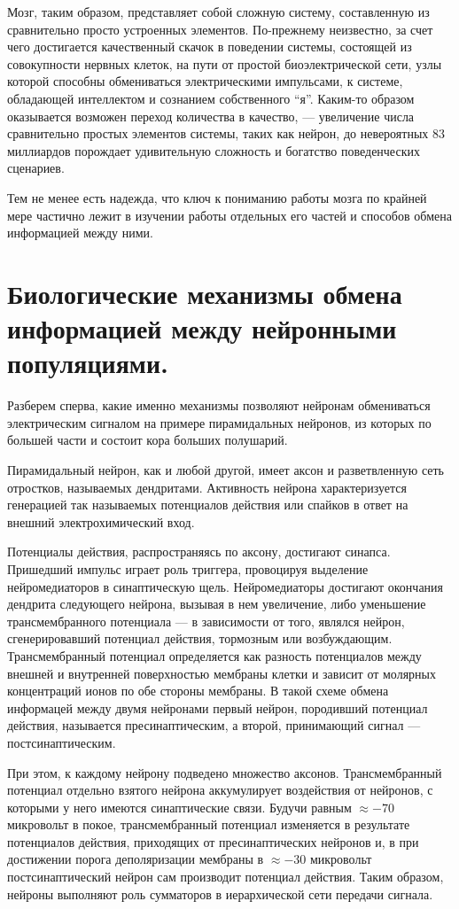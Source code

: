 Мозг, таким образом, представляет собой сложную систему, составленную из сравнительно
просто устроенных элементов.
По-прежнему неизвестно, за счет чего достигается
качественный скачок в поведении системы, состоящей из совокупности
нервных клеток, на пути от простой биоэлектрической сети,
узлы которой способны обмениваться электрическими импульсами, к
системе, обладающей интеллектом и сознанием собственного ``я''.
Каким-то образом оказывается возможен переход количества в качество, --- увеличение
числа сравнительно простых элементов системы,
таких как нейрон, до невероятных 83 миллиардов порождает удивительную
сложность и богатство поведенческих сценариев.

Тем не менее есть надежда, что ключ к пониманию работы мозга по крайней мере
частично лежит в изучении работы отдельных его частей и
способов обмена информацией между ними.

\section{Биологические механизмы обмена информацией между нейронными популяциями.}
Разберем сперва, какие именно механизмы позволяют нейронам обмениваться
электрическим сигналом на примере пирамидальных нейронов, из которых по
большей части и состоит кора больших полушарий.

Пирамидальный нейрон, как и любой другой, имеет аксон и
разветвленную сеть отростков, называемых дендритами.
Активность нейрона характеризуется генерацией так называемых
потенциалов действия или спайков в ответ на внешний электрохимический вход.

Потенциалы действия, распространяясь по аксону, достигают синапса.
Пришедший импульс играет роль триггера, провоцируя выделение
нейромедиаторов в  синаптическую щель. Нейромедиаторы достигают окончания
дендрита следующего нейрона, вызывая в нем увеличение, либо уменьшение
трансмембранного потенциала --- в зависимости от того, являлся
нейрон, сгенерировавший потенциал действия, тормозным или возбуждающим.
Трансмембранный потенциал определяется как разность потенциалов между
внешней и внутренней поверхностью мембраны клетки и зависит от молярных
концентраций ионов по обе стороны мембраны.
В такой схеме обмена информацей между двумя нейронами первый нейрон,
породивший потенциал действия, называется пресинаптическим, а второй,
принимающий сигнал --- постсинаптическим.

При этом, к каждому нейрону подведено множество аксонов.  Трансмембранный
потенциал отдельно взятого нейрона аккумулирует воздействия от нейронов, с
которыми у него имеются синаптические связи. Будучи равным $\approx -70$
микровольт в покое, трансмембранный потенциал изменяется в результате
потенциалов действия, приходящих от пресинаптических нейронов и, в при
достижении порога деполяризации мембраны в $\approx -30$ микровольт
постсинаптический нейрон сам производит потенциал действия.  Таким образом,
нейроны выполняют роль сумматоров в иерархической сети передачи сигнала.

